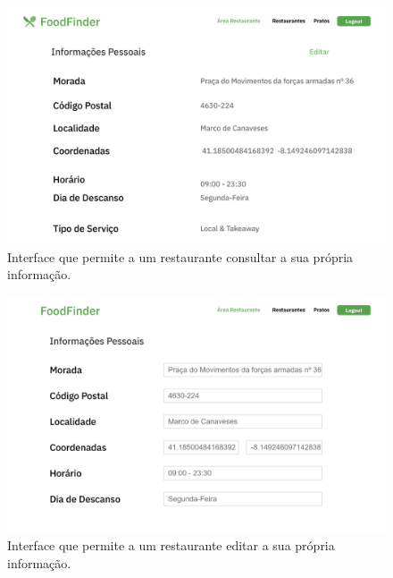 \documentclass[a4paper,12pt]{report}
\begin{document}
	\begin{figure}[H]
	\begin{center}
	\includegraphics[scale=0.25]{3.1-Dados_Pessoais_restaurante}	
	\end{center}
	\caption{Interface que permite a um restaurante consultar a sua própria informação.}
	\end{figure} 
	
	\begin{figure}[H]
	\begin{center}
	\includegraphics[scale=0.25]{4.1-Editar_Dados_restaurante_1}	
	\end{center}
	\caption{Interface que permite a um restaurante editar a sua própria informação.}
	\end{figure} 
	
\end{document}
